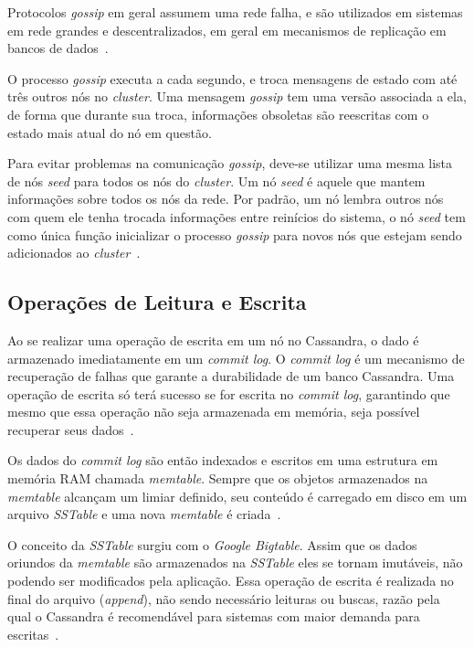 Protocolos \emph{gossip} em geral assumem uma rede falha, e são utilizados em sistemas em rede grandes e descentralizados, em geral em mecanismos de replicação em bancos de dados~\cite{cassandraguide}. 

O processo \emph{gossip} executa a cada segundo, e troca mensagens de estado com até três outros nós no \emph{cluster}. Uma mensagem \emph{gossip} tem uma versão associada a ela, de forma que durante sua troca, informações obsoletas são reescritas com o estado mais atual do nó em questão.

Para evitar problemas na comunicação \emph{gossip}, deve-se utilizar uma mesma lista de nós \emph{seed} para todos os nós do \emph{cluster}. Um nó \emph{seed} é aquele que mantem informações sobre todos os nós da rede. Por padrão, um nó lembra outros nós com quem ele tenha trocada informações entre reinícios do sistema, o nó \emph{seed} tem como única função inicializar o processo \emph{gossip} para novos nós que estejam sendo adicionados ao \emph{cluster}~\cite{cassandradocs}.


\subsection{Operações de Leitura e Escrita}

Ao se realizar uma operação de escrita em um nó no Cassandra, o dado é armazenado imediatamente em um \emph{commit log}. O \emph{commit log} é um mecanismo de recuperação de falhas que garante a durabilidade de um banco Cassandra. Uma operação de escrita só terá sucesso se for escrita no \emph{commit log}, garantindo que mesmo que essa operação não seja armazenada em memória, seja possível recuperar seus dados~\cite{cassandraguide}. 

Os dados do \emph{commit log} são então indexados e escritos em uma estrutura em memória RAM chamada \emph{memtable}. Sempre que os objetos armazenados na \emph{memtable} alcançam um limiar definido, seu conteúdo é carregado em disco em um arquivo \emph{SSTable} e uma nova \emph{memtable} é criada~\cite{cassandraguide}. 

O conceito da \emph{SSTable} surgiu com o \emph{Google Bigtable}. Assim que os dados oriundos da \emph{memtable} são armazenados na \emph{SSTable} eles se tornam imutáveis, não podendo ser modificados pela aplicação. Essa operação de escrita é realizada no final do arquivo (\emph{append}), não sendo necessário leituras ou buscas, razão pela qual o Cassandra é recomendável para sistemas com maior demanda para escritas~\cite{cassandraguide, cassandradocs}.

